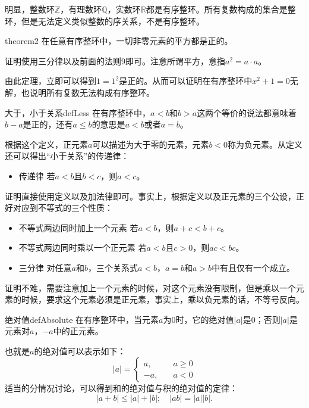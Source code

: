 明显，整数环$\mathbb{Z}$，有理数环$\mathbb{Q}$，实数环$\mathbb{R}$都是有序整环。所有复数构成的集合是整环，但是无法定义类似整数的序关系，不是有序整环。

\begin{theorem}{}{theorem2}
在任意有序整环中，一切非零元素的平方都是正的。
\end{theorem}

证明使用三分律以及前面的法则9即可。注意所谓平方，意指$a^2 = a \cdot a$。

由此定理，立即可以得到$1=1^2$是正的。从而可以证明在有序整环中$x^2+1=0$无解，也说明所有复数无法构成有序整环。

\begin{definition}{大于，小于关系}{defLess}
在有序整环中，$a<b$和$b>a$这两个等价的说法都意味着$b-a$是正的，还有$a \le b$的意思是$a<b$或者$a=b$。
\end{definition}
根据这个定义，正元素$a$可以描述为大于零的元素，元素$b<0$称为负元素。从定义还可以得出“小于关系”的传递律：
\begin{itemize}
\item 传递律 若$a < b$且$b<c$，则$a<c$。
\end{itemize}

证明直接使用定义以及加法律即可。事实上，根据定义以及正元素的三个公设，正好对应到不等式的三个性质：
\begin{itemize}
\item 不等式两边同时加上一个元素 若$a < b$，则$a+c < b+c$。
\item 不等式两边同时乘以一个正元素 若$a < b$且$c > 0$，则$ac < bc$。
\item 三分律 对任意$a$和$b$，三个关系式$a<b$，$a=b$和$a>b$中有且仅有一个成立。
\end{itemize}

证明不难，需要注意加上一个元素的时候，对这个元素没有限制，但是乘以一个元素的时候，要求这个元素必须是正元素，事实上，乘以负元素的话，不等号反向。

\begin{definition}{绝对值}{defAbsolute}
在有序整环中，当元素$a$为0时，它的绝对值$|a|$是0；否则$|a|$是元素对$a$，$-a$中的正元素。
\end{definition}
也就是$a$的绝对值可以表示如下： 
\[
|a| = \left\{
\begin{aligned}
a, &\quad a \ge 0 \\
-a, &\quad a < 0
\end{aligned}
\right.
\]
适当的分情况讨论，可以得到和的绝对值与积的绝对值的定律： 
\begin{equation}\label{equ001010303}
|a+b| \le |a| + |b|; \quad |ab|=|a||b|.
\end{equation}

